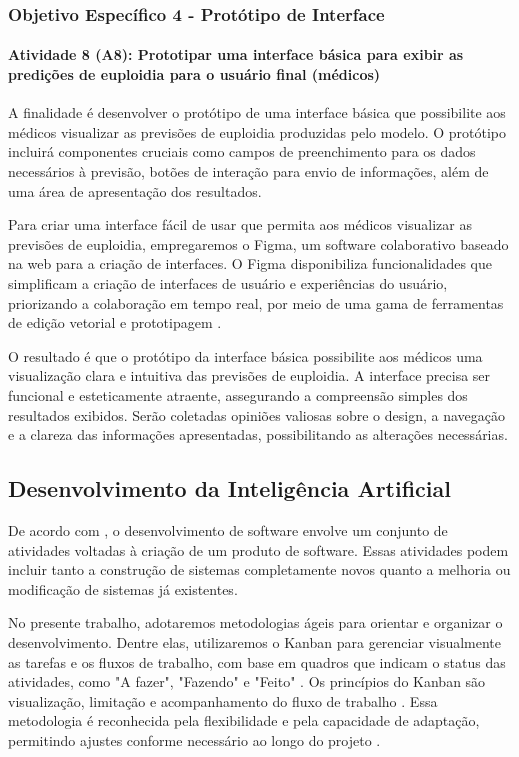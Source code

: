 \subsubsection{\textbf{Objetivo Específico 4} - Protótipo de Interface}

\paragraph{\textbf{Atividade 8 (A8):} Prototipar uma interface básica para exibir as predições de euploidia para o usuário final (médicos)}

A finalidade é desenvolver o protótipo de uma interface básica que possibilite aos médicos visualizar as previsões de euploidia produzidas pelo modelo. O protótipo incluirá componentes cruciais como campos de preenchimento para os dados necessários à previsão, botões de interação para envio de informações, além de uma área de apresentação dos resultados.

Para criar uma interface fácil de usar que permita aos médicos visualizar as previsões de euploidia, empregaremos o Figma, um software colaborativo baseado na web para a criação de interfaces. O Figma disponibiliza funcionalidades que simplificam a criação de interfaces de usuário e experiências do usuário, priorizando a colaboração em tempo real, por meio de uma gama de ferramentas de edição vetorial e prototipagem \cite{figma2024}.

O resultado é que o protótipo da interface básica possibilite aos médicos uma visualização clara e intuitiva das previsões de euploidia. A interface precisa ser funcional e esteticamente atraente, assegurando a compreensão simples dos resultados exibidos. Serão coletadas opiniões valiosas sobre o design, a navegação e a clareza das informações apresentadas, possibilitando as alterações necessárias.

\subsection{Desenvolvimento da Inteligência Artificial}

De acordo com , o desenvolvimento de software envolve um conjunto de atividades voltadas à criação de um produto de software. Essas atividades podem incluir tanto a construção de sistemas completamente novos quanto a melhoria ou modificação de sistemas já existentes.

No presente trabalho, adotaremos metodologias ágeis para orientar e organizar o desenvolvimento. Dentre elas, utilizaremos o Kanban para gerenciar visualmente as tarefas e os fluxos de trabalho, com base em quadros que indicam o status das atividades, como "A fazer", "Fazendo" e "Feito" \cite{kniberg2010}. Os princípios do Kanban são visualização, limitação e acompanhamento do fluxo de trabalho \cite{kniberg2010}. Essa metodologia é reconhecida pela flexibilidade e pela capacidade de adaptação, permitindo ajustes conforme necessário ao longo do projeto \cite{kniberg2010}.

